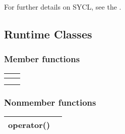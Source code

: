 \documentclass[letterpaper,10pt,english]{sphinxmanual}
\begin{document}
For further details on SYCL, see the .


\subsection{Runtime Classes}
\label{\detokenize{programming-interface/runtime/index:runtime-classes}}\label{\detokenize{programming-interface/runtime/index::doc}}

\subsubsection{}
\label{\detokenize{programming-interface/runtime/device-selector:device-selector}}\label{\detokenize{programming-interface/runtime/device-selector::doc}}
\begin{sphinxVerbatim}[commandchars=\\\{\}]
 
\end{sphinxVerbatim}
\subsubsection*{Member functions}


\begin{savenotes}\sphinxattablestart
\centering
\begin{tabulary}{\linewidth}[t]{|T|T|}
\hline

{\hyperref[\detokenize{programming-interface/runtime/device-selector:constructor}]{}}
&\\
\hline
{\hyperref[\detokenize{programming-interface/runtime/device-selector:destructor}]{}}
&\\
\hline
{\hyperref[\detokenize{programming-interface/runtime/device-selector:select-device}]{}}
&\\
\hline
\end{tabulary}
\par
\sphinxattableend\end{savenotes}
\subsubsection*{Non\sphinxhyphen{}member functions}


\begin{savenotes}\sphinxattablestart
\centering
\begin{tabulary}{\linewidth}[t]{|T|T|}
\hline

operator()
&\\
\hline
\end{tabulary}
\par
\sphinxattableend\end{savenotes}
\end{document}
